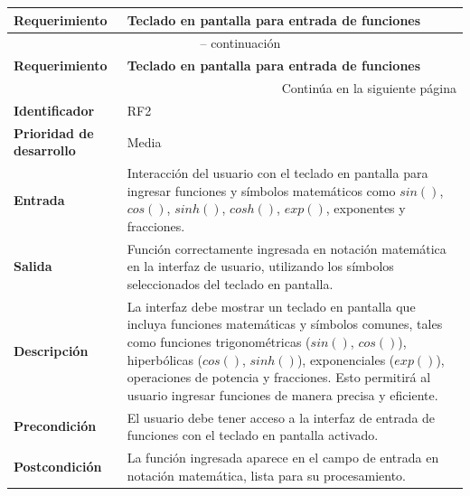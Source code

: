 \begin{longtable}{|m{3.5cm}|m{9.5cm}|}
	\hline
	\rowcolor{black!75} \color{white}\textbf{Requerimiento} & \color{white}\textbf{Teclado en pantalla para entrada de funciones} \\
	\hline
	\endfirsthead
	\multicolumn{2}{c}{{\tablename\ \thetable{} -- continuación}} \\
	\hline
	\rowcolor{black!75} \color{white}\textbf{Requerimiento} & \color{white}\textbf{Teclado en pantalla para entrada de funciones} \\
	\hline
	\endhead
	\hline \multicolumn{2}{r}{{Continúa en la siguiente página}} \\
	\endfoot
	\hline
	\endlastfoot
	
	\textbf{Identificador} & RF2 \\
	\hline
	\textbf{Prioridad de desarrollo} & Media \\
	\hline
	\textbf{Entrada} & Interacción del usuario con el teclado en pantalla para ingresar funciones y símbolos matemáticos como $sin()$, $cos()$, $sinh()$, $cosh()$, $exp()$, exponentes y fracciones. \\
	\hline
	\textbf{Salida} & Función correctamente ingresada en notación matemática en la interfaz de usuario, utilizando los símbolos seleccionados del teclado en pantalla. \\
	\hline
	\textbf{Descripción} & La interfaz debe mostrar un teclado en pantalla que incluya funciones matemáticas y símbolos comunes, tales como funciones trigonométricas ($sin()$, $cos()$), hiperbólicas ($cos()$, $sinh()$), exponenciales ($exp()$), operaciones de potencia y fracciones. Esto permitirá al usuario ingresar funciones de manera precisa y eficiente. \\
	\hline
	\textbf{Precondición} & El usuario debe tener acceso a la interfaz de entrada de funciones con el teclado en pantalla activado. \\
	\hline
	\textbf{Postcondición} & La función ingresada aparece en el campo de entrada en notación matemática, lista para su procesamiento. \\
	\hline
\end{longtable}
 \label{tabla:RF2}
\vspace{0.5cm}

